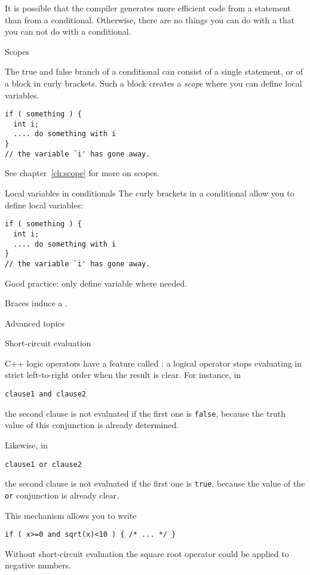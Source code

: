 It is possible that the compiler generates more efficient code
from a  statement than from a conditional.
Otherwise, there are no things you can do with a 
that you can not do with a conditional.

 {Scopes}

The true and false branch of a conditional can consist of a single
statement, or of a block in curly brackets. Such a block creates a
%
\emph{scope}
%
where you can define local variables.

\begin{lstlisting}
if ( something ) {
  int i; 
  .... do something with i
}
// the variable `i' has gone away.
\end{lstlisting}

See chapter~\ref{ch:scope} for more on scopes.

\begin{slide}{Local variables in conditionals}
  \label{sl:if-scope}
  The curly brackets in a conditional allow you to define local variables:
\begin{lstlisting}
if ( something ) {
  int i; 
  .... do something with i
}
// the variable `i' has gone away.
\end{lstlisting}
Good practice: only define variable where needed.

Braces induce a .
\end{slide}

 {Advanced topics}
\label{sec:if-advanced}

 {Short-circuit evaluation}

C++ logic operators have a feature called
:
a logical operator stops evaluating
in strict left-to-right order
when the result is clear.
For instance, in
\begin{lstlisting}
clause1 and clause2
\end{lstlisting}
the second clause is not evaluated if the first one is
\lstinline{false}, because the truth value of this conjunction is
already determined.

Likewise, in
\begin{lstlisting}
clause1 or clause2
\end{lstlisting}
the second clause is not evaluated if the first one is \lstinline{true},
because the value of the \lstinline{or} conjunction is already clear.

This mechanism allows you to write
\begin{lstlisting}
if ( x>=0 and sqrt(x)<10 ) { /* ... */ }
\end{lstlisting}
Without short-circuit evaluation the square root operator could be applied to
negative numbers.

